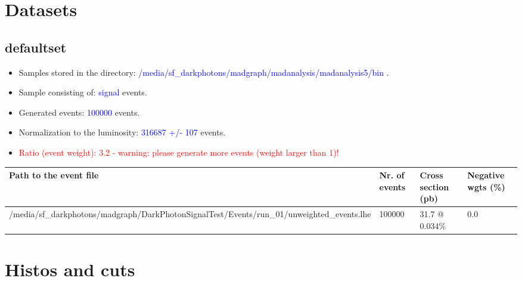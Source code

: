 \documentclass[a4paper, 11pt]{article}
\begin{document}
\section{ Datasets}

\subsection{ defaultset}

\begin{itemize}
  \item Samples stored in the directory: \textcolor{blue}{/\-media/\-sf\_darkphotons/\-madgraph/\-madanalysis/\-madanalysis5/\-bin} .
   \item Sample consisting of: \textcolor{blue}{signal}  events.
   \item Generated events: \textcolor{blue}{100000 }  events.
   \item Normalization to the luminosity: \textcolor{blue}{316687}\textcolor{blue}{ +/\-- }\textcolor{blue}{107 }  events.
   \item\textcolor{red}{Ratio (event weight): }\textcolor{red}{3.2 }\textcolor{red}{ - warning: please generate more events (weight larger than 1)!}
\textcolor{red}{}
\end{itemize}
\begin{table}[!h]
  \begin{center}
    \begin{tabular}{|m{51.0mm}|m{24.0mm}|m{28.0mm}|m{28.0mm}|}
      \hline
      \cellcolor{yellow}         Path to the event file& \cellcolor{yellow}         Nr. of events& \cellcolor{yellow}         Cross section (pb)& \cellcolor{yellow}         Negative wgts (\%)\\
      \hline
      \cellcolor{white}          /\-media/\-sf\_darkphotons/\-madgraph/\-DarkPhotonSignalTest/\-Events/\-run\_01/\-unweighted\_events.lhe& \cellcolor{white}          100000& \cellcolor{white}          31.7 @ 0.034\%& \cellcolor{white}          0.0\\
\hline
    \end{tabular}
  \end{center}
\end{table}

\newpage
\section{ Histos and cuts}
\end{document}
